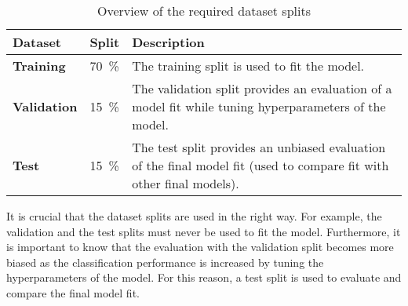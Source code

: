 \begin{table}
  \caption{Overview of the required dataset splits \cite{}} %
  \label{tab:dataset_splits}
  \centering
  \begin{tabular}{llp{10cm}}
    \toprule
    \textbf{Dataset} & \textbf{Split} & \textbf{Description} \\
    \midrule
    \textbf{Training} & \SI{70}{\percent} & The training split is used to fit the model. \\
    \midrule
    \textbf{Validation} & \SI{15}{\percent} & The validation split provides an evaluation of a model fit while tuning hyperparameters of the model. \\
    \midrule
    \textbf{Test} & \SI{15}{\percent} & The test split provides an unbiased evaluation of the final model fit (used to compare fit with other final models). \\
    \bottomrule
  \end{tabular}
\end{table}

It is crucial that the dataset splits are used in the right way.
For example, the validation and the test splits must never be used to fit the model.
Furthermore, it is important to know that the evaluation with the validation split becomes more biased as the classification performance is increased by tuning the hyperparameters of the model.
For this reason, a test split is used to evaluate and compare the final model fit.

